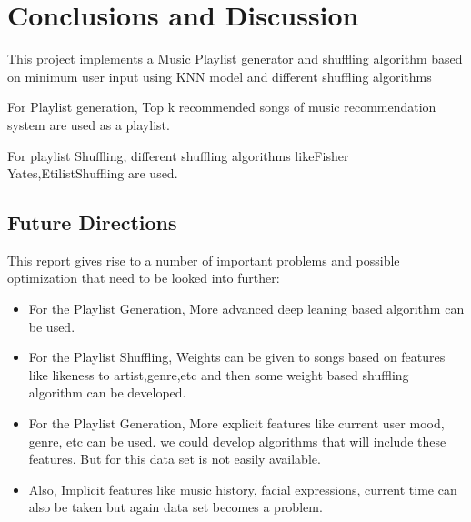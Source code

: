 \chapter{Conclusions and Discussion}\label{final}
This project implements a Music Playlist generator and shuffling algorithm based on minimum user input using KNN model and different shuffling algorithms

For Playlist generation, Top k recommended songs of music recommendation system  are used as a playlist.

For playlist Shuffling, different shuffling algorithms likeFisher Yates,EtilistShuffling are used.

\section*{Future Directions}
This report gives rise to a number of important problems and possible optimization that need to be looked into further:
\begin{itemize}

\item {For the Playlist Generation, More advanced deep leaning based algorithm can be used.}

\item {For the Playlist Shuffling, Weights can be given to songs based on features like likeness to artist,genre,etc and then some weight based shuffling algorithm can be developed.}

\item {For the Playlist Generation, More explicit features like current user mood, genre, etc can be used. we could develop algorithms that will include these features. But for this data set is not easily available.}

\item {Also, Implicit features like music history, facial expressions, current time can also be taken but again data set becomes a problem. }


 \end{itemize}

